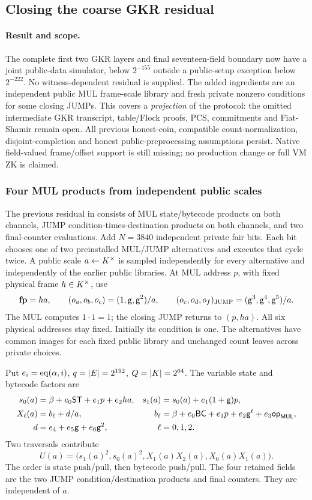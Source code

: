 \subsection{Closing the coarse GKR residual}\label{note:zk-mul-control}

\paragraph{Result and scope.} The complete first two GKR layers and final seventeen-field boundary now have a joint public-data simulator, below $2^{-155}$ outside a public-setup exception below $2^{-222}$. No witness-dependent residual is supplied. The added ingredients are an independent public MUL frame-scale library and fresh private nonzero conditions for some closing JUMPs. This covers a \emph{projection} of the protocol: the omitted intermediate GKR transcript, table/Flock proofs, PCS, commitments and Fiat-Shamir remain open. All previous honest-coin, compatible count-normalization, disjoint-completion and honest public-preprocessing assumptions persist. Native field-valued frame/offset support is still missing; no production change or full VM ZK is claimed.

\subsubsection{Four MUL products from independent public scales}

The previous residual in  consists of MUL state/bytecode products on both channels, JUMP condition-times-destination products on both channels, and two final-counter evaluations. Add $N=3840$ independent private fair bits. Each bit chooses one of two preinstalled MUL/JUMP alternatives and executes that cycle twice. A public scale $a\gets K^\times$ is sampled independently for every alternative and independently of the earlier public libraries. At MUL address $p$, with fixed physical frame $h\in K^\times$, use
\[
 \mathbf{fp}=ha,\qquad (o_a,o_b,o_c)=(1,\mathsf{g},\mathsf{g}^2)/a,
 \qquad (o_c,o_d,o_f)_{\rm JUMP}=(\mathsf{g}^3,\mathsf{g}^4,\mathsf{g}^5)/a.
\]
The MUL computes $1\cdot1=1$; the closing JUMP returns to $(p,ha)$. All six physical addresses stay fixed. Initially its condition is one. The alternatives have common images for each fixed public library and unchanged count leaves across private choices.

Put $e_i=\operatorname{eq}(\alpha,i)$, $q=|E|=2^{192}$, $Q=|K|=2^{64}$. The variable state and bytecode factors are
\[
\begin{aligned}
 s_0(a)&=\beta+e_0\mathsf{ST}+e_1p+e_2ha,&s_1(a)&=s_0(a)+e_1(1+\mathsf{g})p,\\
 X_\ell(a)&=b_\ell+d/a,&
 b_\ell&=\beta+e_0\mathsf{BC}+e_1p+e_2\mathsf{g}^\ell+e_3\mathsf{op}_{\mathsf{MUL}},\\
 d&=e_4+e_5\mathsf{g}+e_6\mathsf{g}^2,&\ell&=0,1,2.
\end{aligned}
\]
Two traversals contribute
\[
 U(a)=\bigl(s_1(a)^2,s_0(a)^2,X_1(a)X_2(a),X_0(a)X_1(a)\bigr).
\]
The order is state push/pull, then bytecode push/pull. The four retained fields are the two JUMP condition/destination products and final counters. They are independent of $a$.

